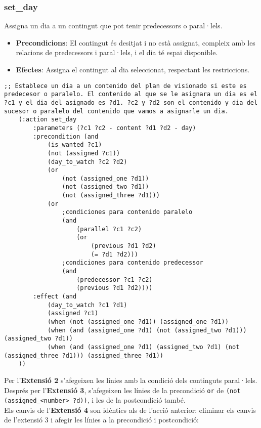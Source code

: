 \documentclass[a4paper]{article}
\begin{document}
	\subsubsection*{set\_day}
	Assigna un dia a un contingut que pot tenir predecessors o paral·lels.
	
	\begin{itemize}
		\item \textbf{Precondicions}: El contingut és desitjat i no està assignat, compleix amb les relacions de predecessors i paral·lels, i el dia té espai disponible.
		\item \textbf{Efectes}: Assigna el contingut al dia seleccionat, respectant les restriccions.
	\end{itemize}
	
	\begin{lstlisting}[language=PDDL, caption={Acció set\_day}, label={lst:set_day}]
	;; Establece un dia a un contenido del plan de visionado si este es predecesor o paralelo. El contenido al que se le asignara un dia es el ?c1 y el dia del asignado es ?d1. ?c2 y ?d2 son el contenido y dia del sucesor o paralelo del contenido que vamos a asignarle un dia.
	(:action set_day
		:parameters (?c1 ?c2 - content ?d1 ?d2 - day)
		:precondition (and 
			(is_wanted ?c1)
			(not (assigned ?c1))
			(day_to_watch ?c2 ?d2)
			(or 
				(not (assigned_one ?d1))
				(not (assigned_two ?d1))
				(not (assigned_three ?d1)))
			(or 
				;condiciones para contenido paralelo
				(and
					(parallel ?c1 ?c2)
					(or 
						(previous ?d1 ?d2)
						(= ?d1 ?d2)))
				;condiciones para contenido predecessor
				(and
					(predecessor ?c1 ?c2)
					(previous ?d1 ?d2))))
		:effect (and 
			(day_to_watch ?c1 ?d1)
			(assigned ?c1)
			(when (not (assigned_one ?d1)) (assigned_one ?d1))
			(when (and (assigned_one ?d1) (not (assigned_two ?d1))) (assigned_two ?d1))
			(when (and (assigned_one ?d1) (assigned_two ?d1) (not (assigned_three ?d1))) (assigned_three ?d1))
	))
	\end{lstlisting}
	
	\noindent Per l'\textbf{Extensió 2} s'afegeixen les línies amb la condició dels continguts paral·lels. Després per l'\textbf{Extensió 3}, s'afegeixen les línies de la precondició \texttt{or} de \texttt{(not (assigned\_<number> ?d))}, i les de la postcondició també. \\
	
	\noindent Els canvis de l'\textbf{Extensió 4} son idèntics als de l'acció anterior: eliminar els canvis de l'extensió 3 i afegir les línies a la precondició i postcondició:
	
\end{document}
